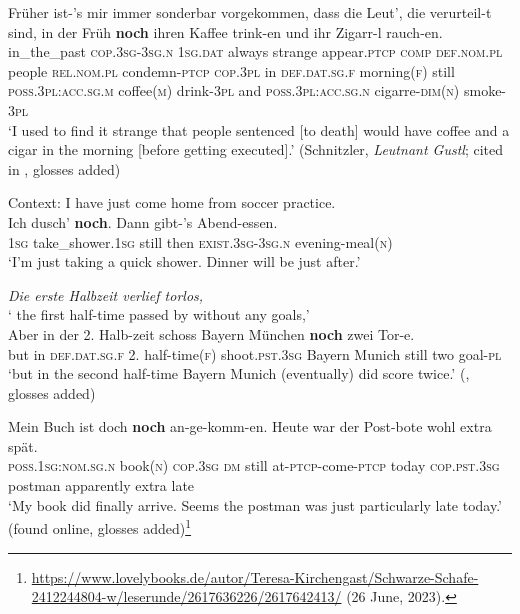 \begin{exe}
	\ex \gll Früher ist-'s mir immer sonderbar vorgekommen, dass die Leut', die verurteil-t sind, in der Früh \textbf{noch} ihren Kaffee trink-en und ihr Zigarr-l rauch-en.\\
in\_the\_past \textsc{cop}.3\textsc{sg}-3\textsc{sg}.\textsc{n} 1\textsc{sg}.\textsc{dat} always strange appear.\textsc{ptcp} \textsc{comp} \textsc{def}.\textsc{nom}.\textsc{pl} people \textsc{rel}.\textsc{nom}.\textsc{pl} condemn-\textsc{ptcp} \textsc{cop}.3\textsc{pl} in \textsc{def}.\textsc{dat}.\textsc{sg}.\textsc{f} morning(\textsc{f}) still \textsc{poss}.3\textsc{pl}:\textsc{acc}.\textsc{sg}.\textsc{m} coffee(\textsc{m}) drink-3\textsc{pl} and \textsc{poss}.3\textsc{pl}:\textsc{acc}.\textsc{sg}.\textsc{n} cigarre-\textsc{dim}(\textsc{n}) smoke-3\textsc{pl}\\
\glt \lq I used to find it strange that people sentenced [to death] would have coffee and a cigar in the morning [before getting executed].' (Schnitzler, \textit{Leutnant Gustl}; cited in \cite[58]{Shetter1966}, glosses added)

	\ex Context: I have just come home from soccer practice.\\
	\gll Ich dusch' \textbf{noch}. Dann gibt-'s Abend-essen.\\
	1\textsc{sg} take\_shower.1\textsc{sg} still then \textsc{exist}.3\textsc{sg}-3\textsc{sg}.\textsc{n} evening-meal(\textsc{n})\\
	\glt \lq I'm just taking a quick shower. Dinner will be just after.' \parencite[16]{Beck2019}
	
	\ex \textit{Die erste Halbzeit verlief torlos,}\\
	\lq{} the first half-time passed by without any goals,\rq{}\\
	\gll Aber in der 2. Halb-zeit schoss Bayern München \textbf{noch} zwei Tor-e.\\
	but in \textsc{def}.\textsc{dat}.\textsc{sg}.\textsc{f} 2. half-time(\textsc{f}) shoot.\textsc{pst}.3\textsc{sg} Bayern Munich still two goal-\textsc{pl}\\
	\glt \lq but in the second half-time Bayern Munich (eventually) did score twice.' (\cite[127]{HoepelmanRohrer1980}, glosses added)
	
		\ex\label{exAppendixGermanFurtherTo4}
		\gll Mein Buch ist doch \textbf{noch} an-ge-komm-en. Heute war der Post-bote wohl extra spät.\\
	\textsc{poss}.1\textsc{sg}:\textsc{nom}.\textsc{sg}.\textsc{n} book(\textsc{n}) \textsc{cop}.3\textsc{sg} \textsc{dm} still at-\textsc{ptcp}-come-\textsc{ptcp} today \textsc{cop}.\textsc{pst}.3\textsc{sg} postman apparently extra late\\
	\glt \lq My book did finally arrive. Seems the postman was just particularly late today.\rq{ }(found online, glosses added)\footnote{\url{https://www.lovelybooks.de/autor/Teresa-Kirchengast/Schwarze-Schafe-2412244804-w/leserunde/2617636226/2617642413/} (26 June, 2023).}
\end{exe}



